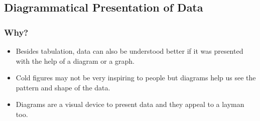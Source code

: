 \documentclass[
10pt, %
a4paper, %
]{report}
\begin{document}
\subsection*{Diagrammatical Presentation of Data}

\subsubsection*{Why?}
\begin{itemize}
\item Besides tabulation, data can also be understood better if it was presented with the help of a diagram or a graph.
\item Cold figures may not be very inspiring to people but diagrams help us see the pattern and shape of the data.
\item Diagrams are a visual device to present data and they appeal to a layman too.
\end{itemize}
\end{document}
